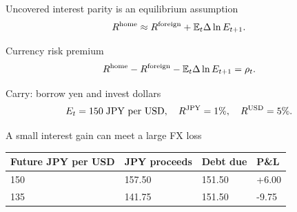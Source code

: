 \documentclass[12pt,aspectratio=169]{beamer}
\begin{document}

\begin{frame}{Uncovered interest parity is an equilibrium assumption}
\[R^{\rm home}\approx R^{\rm foreign}+\mathbb E_t\Delta\ln E_{t+1}.\]
\end{frame}


\begin{frame}{Currency risk premium}
\[R^{\rm home}-R^{\rm foreign}-\mathbb E_t\Delta\ln E_{t+1}=\rho_t.\]
\end{frame}


\begin{frame}{Carry: borrow yen and invest dollars}
\[E_t=150\;\text{JPY per USD},\quad R^{\rm JPY}=1\%,\quad R^{\rm USD}=5\%.\]
\end{frame}


\begin{frame}{A small interest gain can meet a large FX loss}
\begin{center}\begin{tabular}{@{}llll@{}}\toprule \textbf{Future JPY per USD} & \textbf{JPY proceeds} & \textbf{Debt due} & \textbf{P\&L}\\\midrule 150 & 157.50 & 151.50 & +6.00\\[2mm]
135 & 141.75 & 151.50 & -9.75\\\bottomrule\end{tabular}\end{center}
\end{frame}

\end{document}
